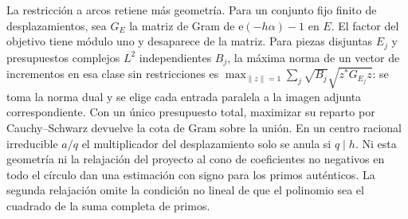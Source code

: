 \documentclass[11pt,a4paper]{article}
\newcommand{\B}[2]{#2}
\newcommand{\B}[2]{#1}
\newcommand{\e}{\mathrm e}
\begin{document}
\B{Arc restriction retains more geometry. For shifts in a fixed finite set, let $G_E$ be the Gram matrix of $\e(-h\alpha)-1$ on $E$. The target factor has modulus one, so it cancels from the Gram matrix. For disjoint pieces $E_j$ and independent complex $L^2$ budgets $B_j$, the largest possible norm of an increment vector over that unrestricted class is $\max_{\|z\|=1}\sum_j\sqrt{B_j}\sqrt{z^*G_{E_j}z}$: take the dual norm and choose each input parallel to the corresponding adjoint image. With just a total budget, maximizing over its allocation by Cauchy--Schwarz recovers the single Gram bound on the union. A rational center $a/q$ has zero shift multiplier only when $q\mid h$ in lowest terms. Neither this geometric structure nor the project's full-circle nonnegative-coefficient cone relaxation yields an actual-prime signed estimate. The latter relaxation drops the nonlinear condition that the polynomial is the square of the full prime sum.}{La restricción a arcos retiene más geometría. Para un conjunto fijo finito de desplazamientos, sea $G_E$ la matriz de Gram de $\e(-h\alpha)-1$ en $E$. El factor del objetivo tiene módulo uno y desaparece de la matriz. Para piezas disjuntas $E_j$ y presupuestos complejos $L^2$ independientes $B_j$, la máxima norma de un vector de incrementos en esa clase sin restricciones es $\max_{\|z\|=1}\sum_j\sqrt{B_j}\sqrt{z^*G_{E_j}z}$: se toma la norma dual y se elige cada entrada paralela a la imagen adjunta correspondiente. Con un único presupuesto total, maximizar su reparto por Cauchy--Schwarz devuelve la cota de Gram sobre la unión. En un centro racional irreducible $a/q$ el multiplicador del desplazamiento solo se anula si $q\mid h$. Ni esta geometría ni la relajación del proyecto al cono de coeficientes no negativos en todo el círculo dan una estimación con signo para los primos auténticos. La segunda relajación omite la condición no lineal de que el polinomio sea el cuadrado de la suma completa de primos.}
\end{document}
